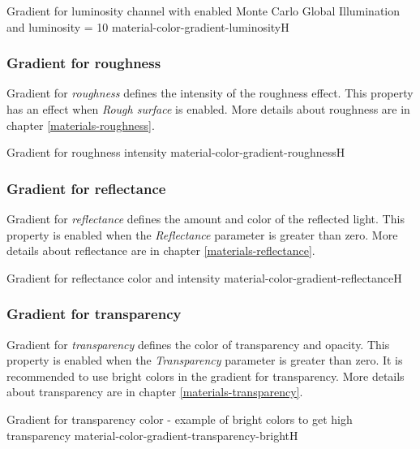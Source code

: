 {Gradient for luminosity channel with enabled Monte Carlo Global Illumination and luminosity = 10}
{material-color-gradient-luminosity}{H}

\subsubsection{Gradient for roughness}\label{materials-roughness-gradient}

Gradient for \emph{roughness} defines the intensity of the roughness effect. This property has an effect when \emph{Rough surface} is enabled. More details about roughness are in chapter \ref{materials-roughness}.

{Gradient for roughness intensity}
{material-color-gradient-roughness}{H}

\subsubsection{Gradient for reflectance}\label{materials-reflectance-gradient}

Gradient for \emph{reflectance} defines the amount and color of the reflected light. This property is enabled when the \emph{Reflectance} parameter is greater than zero. More details about reflectance are in chapter \ref{materials-reflectance}.

{Gradient for reflectance color and intensity}
{material-color-gradient-reflectance}{H}

\subsubsection{Gradient for transparency}\label{materials-transparency-gradient}

Gradient for \emph{transparency} defines the color of transparency and opacity. This property is enabled when the \emph{Transparency} parameter is greater than zero. 
It is recommended to use bright colors in the gradient for transparency. More details about transparency are in chapter \ref{materials-transparency}.

{Gradient for transparency color - example of bright colors to get high transparency}
{material-color-gradient-transparency-bright}{H}

